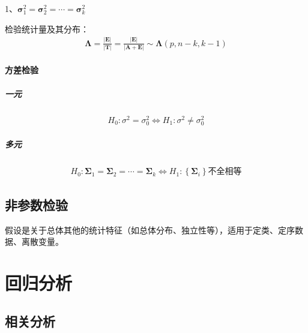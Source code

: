 \documentclass[12pt]{book}
\begin{document}
1、$\bm{\sigma}_1^2=\bm{\sigma}_2^2=\cdots=\bm{\sigma}_k^2$

检验统计量及其分布：
\begin{gather*}
    \bm{\Lambda}=\frac{\left|\bm{E}\right|}{\left|\bm{T}\right|}=\frac{\left|\bm{E}\right|}{\left|\bm{A}+\bm{E}\right|} \sim\bm{\Lambda}(p,n-k,k-1)
\end{gather*}


\subsubsection{方差检验}

\paragraph{一元}

\begin{gather*}
    H_0:\sigma^2=\sigma_0^2 \Leftrightarrow	H_1:\sigma^2\neq\sigma_0^2
\end{gather*}


\paragraph{多元}

\begin{gather*}
    H_0:\bm{\Sigma}_1=\bm{\Sigma}_2=\cdots=\bm{\Sigma}_k\Leftrightarrow H_1:\left\{\bm{\Sigma}_i\right\}\text{不全相等}
\end{gather*}















\section{非参数检验}



假设是关于总体其他的统计特征（如总体分布、独立性等），适用于定类、定序数据、离散变量。






\chapter{回归分析}


\section{相关分析}
\end{document}
